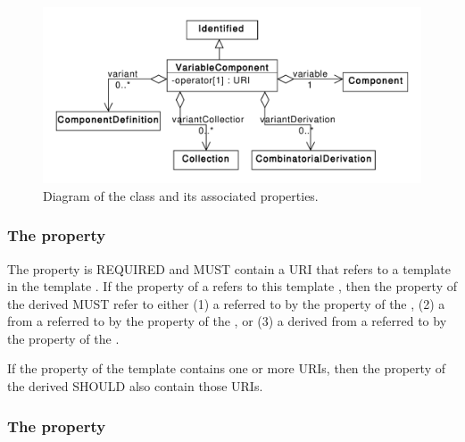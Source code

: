 \begin{figure}[ht]
\begin{center}
\includegraphics[scale=0.6]{uml/variable_component}
\caption[]{Diagram of the  class and its associated properties.}
\label{uml:variable_component}
\end{center}
\end{figure}

\subsubsection*{ The  property}\label{sec:variable}

The  property is REQUIRED and MUST contain a URI that refers to a template  in the template . If the  property of a  refers to this template , then the  property of the derived  MUST refer to either (1) a  referred to by the  property of the , (2) a  from a  referred to by the  property of the , or (3) a  derived from a  referred to by the  property of the .

If the  property of the template  contains one or more URIs, then the  property of the derived  SHOULD also contain those URIs.

\subsubsection*{ The  property}\label{sec:variants}

